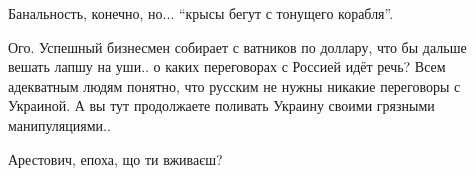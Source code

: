 \begin{itemize}
Банальность, конечно, но... \enquote{крысы бегут с тонущего корабля}.


Ого. Успешный бизнесмен собирает с ватников по доллару, что бы дальше вешать
лапшу на уши.. о каких переговорах с Россией идёт речь? Всем адекватным людям
понятно, что русским не нужны никакие переговоры с Украиной. А вы тут
продолжаете поливать Украину своими грязными манипуляциями..


Арестович, епоха, що ти вживаєш?

\end{itemize} %
